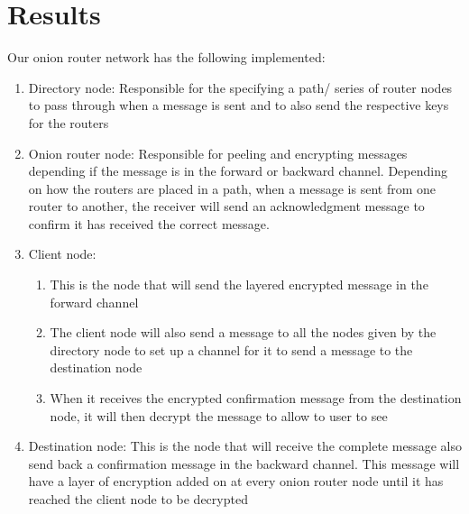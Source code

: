 \documentclass[10pt]{report}
\begin{document}
\chapter{Results}
Our onion router network has the following implemented: 
\begin{enumerate}
    \item Directory node: Responsible for the specifying a path/ series of router nodes to pass through when a message is sent and to also send the respective keys for the routers
    \item Onion router node: Responsible for peeling and encrypting messages depending if the message is in the forward or backward channel. Depending on how the routers are placed in a path, when a message is sent from one router to another, the receiver will send an acknowledgment message to confirm it has received the correct message.
    \item Client node:
    \begin{enumerate}
        \item This is the node that will send the layered encrypted message in the forward channel
        \item The client node will also send a message to all the nodes given by the directory node to set up a channel for it to send a message to the destination node
        \item When it receives the encrypted confirmation message from the destination node, it will then decrypt the message to allow to user to see
    \end{enumerate}
    \item Destination node: This is the node that will receive the complete message also send back a confirmation message in the backward channel. This message will have a layer of encryption added on at every onion router node until it has reached the client node to be decrypted
\end{enumerate}
\end{document}
